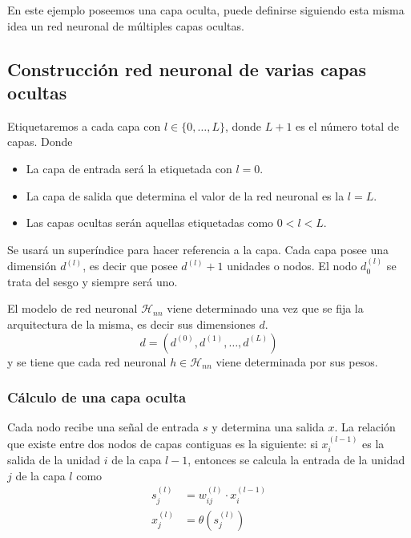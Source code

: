 En este ejemplo poseemos una capa oculta, 
puede definirse siguiendo esta misma idea
un red neuronal de múltiples capas ocultas. 

\subsection{Construcción red neuronal de varias capas ocultas} \label{rrnn:construcción_generalizada}

Etiquetaremos a cada capa con $l \in \{0, \ldots, L \}$, donde $L+1$ es el número total de capas.  Donde 

\begin{itemize}
    \item La capa de entrada será la etiquetada con $l = 0$.
    \item La capa de salida que determina el valor de la red neuronal es la $l=L$.
    \item Las capas ocultas serán aquellas etiquetadas como $0 < l <L.$
\end{itemize}

Se usará un superíndice para hacer referencia a la capa. 
Cada capa posee una dimensión $d^{(l)}$, es decir que posee
$d^{(l)} + 1$ unidades o nodos. El nodo $d_0^{(l)}$ se trata del sesgo y siempre será uno. 

El modelo de red neuronal $\mathcal{H}_{n n}$ viene determinado una vez que se fija la arquitectura de la misma, es decir sus dimensiones $d$. 
\begin{equation}
    d = (d^{(0)}, d^{(1)}, \ldots, d^{(L)})
\end{equation}
y se tiene que cada red neuronal $h \in \mathcal{H}_{n n}$
viene determinada por sus pesos. 

\subsubsection*{Cálculo de una capa oculta}  
Cada nodo recibe una señal de entrada $s$ y determina una salida $x$. 
La relación que existe entre dos nodos de capas contiguas es la siguiente: si $x_i^{(l-1)}$ es la salida de la unidad $i$ de la capa $l-1$, 
entonces se calcula la entrada de la unidad $j$ de la capa $l$ como 
\begin{align}\label{eq:construcción_red_neuronas:calculo_una_capa_oculta}
    s_j^{(l)} &= w_{i j}^{(l)} \cdot x_i^{(l-1)}  \\
    x_j^{(l)} &= \theta(s_j^{(l)})
\end{align}

